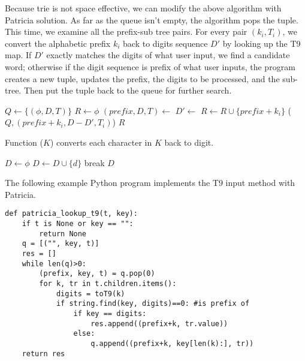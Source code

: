 \documentclass[UTF8]{article}
\begin{document}
Because trie is not space effective, we can modify the above algorithm with
Patricia solution. As far as the queue isn't empty, the algorithm pops the
tuple. This time, we examine all the prefix-sub tree pairs. For every pair
$(k_i, T_i)$, we convert the alphabetic prefix $k_i$ back to digits sequence $D'$
by looking up the T9 map. If $D'$ exactly matches the digits of what user input,
we find a candidate word; otherwise if the digit sequence is prefix of what user inputs,
the program creates a new tuple, updates the prefix, the digits to be processed,
and the sub-tree. Then put the tuple back to the queue for further search.

\begin{algorithmic}[1]
  \State $Q \gets \{(\phi, D, T)\}$
  \State $R \gets \phi$
    \State $(prefix, D, T) \gets$ 
      \State $D' \gets$ 
       
          \State $R \gets R \cup \{prefix + k_i\}$
        \Else
          \State {}($Q, (prefix + k_i, D - D', T_i)$)
        \EndIf
      \EndIf
    \EndFor
  \EndWhile
  \State \Return $R$
\EndFunction
\end{algorithmic}

Function ($K$) converts each character in $K$ back to digit.

\begin{algorithmic}[1]
  \State $D \gets \phi$
         \State $D \gets D \cup \{d\}$
         \State break
       \EndIf
     \EndFor
  \EndFor
  \State \Return $D$
\EndFunction
\end{algorithmic}

The following example Python program implements the T9 input method with Patricia.

\lstset{language=Python}
\begin{lstlisting}
def patricia_lookup_t9(t, key):
    if t is None or key == "":
        return None
    q = [("", key, t)]
    res = []
    while len(q)>0:
        (prefix, key, t) = q.pop(0)
        for k, tr in t.children.items():
            digits = toT9(k)
            if string.find(key, digits)==0: #is prefix of
                if key == digits:
                    res.append((prefix+k, tr.value))
                else:
                    q.append((prefix+k, key[len(k):], tr))
    return res
\end{lstlisting}
\end{document}
